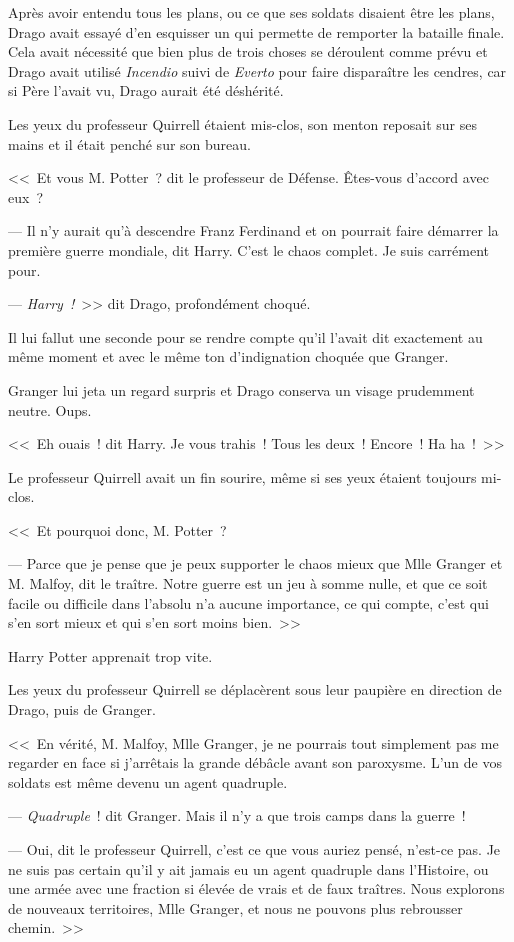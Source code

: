 Après avoir entendu tous les plans, ou ce que ses soldats disaient être les plans, Drago avait essayé d'en esquisser un qui permette de remporter la bataille finale. Cela avait nécessité que bien plus de trois choses se déroulent comme prévu et Drago avait utilisé \emph{Incendio} suivi de \emph{Everto} pour faire disparaître les cendres, car si Père l'avait vu, Drago aurait été déshérité.

Les yeux du professeur Quirrell étaient mis-clos, son menton reposait sur ses mains et il était penché sur son bureau.

<<~Et vous M. Potter~? dit le professeur de Défense. Êtes-vous d'accord avec eux~?

--- Il n'y aurait qu'à descendre Franz Ferdinand et on pourrait faire démarrer la première guerre mondiale, dit Harry. C'est le chaos complet. Je suis carrément pour.

--- \emph{Harry~!}~>> dit Drago, profondément choqué.

Il lui fallut une seconde pour se rendre compte qu'il l'avait dit exactement au même moment et avec le même ton d'indignation choquée que Granger.

Granger lui jeta un regard surpris et Drago conserva un visage prudemment neutre. Oups.

<<~Eh ouais~! dit Harry. Je vous trahis~! Tous les deux~! Encore~! Ha ha~!~>>

Le professeur Quirrell avait un fin sourire, même si ses yeux étaient toujours mi-clos.

<<~Et pourquoi donc, M. Potter~?

--- Parce que je pense que je peux supporter le chaos mieux que Mlle Granger et M. Malfoy, dit le traître. Notre guerre est un jeu à somme nulle, et que ce soit facile ou difficile dans l'absolu n'a aucune importance, ce qui compte, c'est qui s'en sort mieux et qui s'en sort moins bien.~>>

Harry Potter apprenait trop vite.

Les yeux du professeur Quirrell se déplacèrent sous leur paupière en direction de Drago, puis de Granger.

<<~En vérité, M. Malfoy, Mlle Granger, je ne pourrais tout simplement pas me regarder en face si j'arrêtais la grande débâcle avant son paroxysme. L'un de vos soldats est même devenu un agent quadruple.

--- \emph{Quadruple}~! dit Granger. Mais il n'y a que trois camps dans la guerre~!

--- Oui, dit le professeur Quirrell, c'est ce que vous auriez pensé, n'est-ce pas. Je ne suis pas certain qu'il y ait jamais eu un agent quadruple dans l'Histoire, ou une armée avec une fraction si élevée de vrais et de faux traîtres. Nous explorons de nouveaux territoires, Mlle Granger, et nous ne pouvons plus rebrousser chemin.~>>

